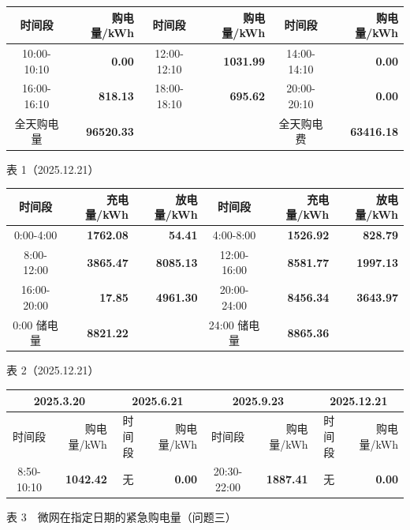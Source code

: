 {\begin{center}
\begin{minipage}[t]{0.485\linewidth}
\end{minipage}
\vspace{0.15\baselineskip}
\noindent
\begin{minipage}[t]{0.485\linewidth}
\begin{tabular}{|c|r|c|r|c|r|}
\hline
时间段 & 购电量/kWh & 时间段 & 购电量/kWh & 时间段 & 购电量/kWh \\
\hline
10:00-10:10 & \textbf{0.00} & 12:00-12:10 & \textbf{1031.99} & 14:00-14:10 & \textbf{0.00} \\
\hline
16:00-16:10 & \textbf{818.13} & 18:00-18:10 & \textbf{695.62} & 20:00-20:10 & \textbf{0.00} \\
\hline
全天购电量 & \textbf{96520.33} & & & 全天购电费 & \textbf{63416.18} \\
\hline
\end{tabular}
\par{表 1（2025.12.21）}

\end{minipage}\hfill
\begin{minipage}[t]{0.485\linewidth}
\begin{tabular}{|c|r|r|c|r|r|}
\hline
时间段 & 充电量/kWh & 放电量/kWh & 时间段 & 充电量/kWh & 放电量/kWh \\
\hline
0:00-4:00 & \textbf{1762.08} & \textbf{54.41} & 4:00-8:00 & \textbf{1526.92} & \textbf{828.79} \\
\hline
8:00-12:00 & \textbf{3865.47} & \textbf{8085.13} & 12:00-16:00 & \textbf{8581.77} & \textbf{1997.13} \\
\hline
16:00-20:00 & \textbf{17.85} & \textbf{4961.30} & 20:00-24:00 & \textbf{8456.34} & \textbf{3643.97} \\
\hline
0:00 储电量 & \textbf{8821.22} & & 24:00 储电量 & \textbf{8865.36} & \\
\hline
\end{tabular}
\par{表 2（2025.12.21）}

\end{minipage}
\vspace{0.15\baselineskip}
\begin{tabular}{|c|r|c|r|c|r|c|r|}
\hline
\multicolumn{2}{c|}{2025.3.20} & \multicolumn{2}{c|}{2025.6.21} & \multicolumn{2}{c|}{2025.9.23} & \multicolumn{2}{c|}{2025.12.21} \\
\hline
时间段 & 购电量/kWh & 时间段 & 购电量/kWh & 时间段 & 购电量/kWh & 时间段 & 购电量/kWh \\
\hline
8:50-10:10 & \textbf{1042.42} & 无 & \textbf{0.00} & 20:30-22:00 & \textbf{1887.41} & 无 & \textbf{0.00} \\
\hline
\end{tabular}
\par{表 3　微网在指定日期的紧急购电量（问题三）}

\end{center}
}
